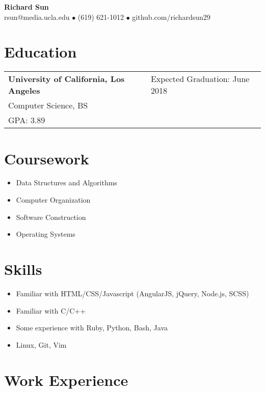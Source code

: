 \documentclass{article}
\begin{document}

  \begin{center}
    \Huge \textbf{Richard Sun}\\[1ex]
    \large
    rsun@media.ucla.edu $\bullet$
    (619) 621-1012 $\bullet$
    github.com/richardsun29
  \end{center}


  \section*{Education}

    \begin{tabularx}{\textwidth}{Xl}
      \textbf{University of California, Los Angeles} & Expected Graduation: June 2018\\
      Computer Science, BS &\\
      GPA: 3.89
    \end{tabularx}


  \section*{Coursework}

    \begin{itemize}
      \item Data Structures and Algorithms
      \item Computer Organization
      \item Software Construction
      \item Operating Systems
    \end{itemize}


  \section*{Skills}

    \begin{itemize}
      \item Familiar with HTML/CSS/Javascript (AngularJS, jQuery, Node.js, SCSS)
      \item Familiar with C/C++
      \item Some experience with Ruby, Python, Bash, Java
      \item Linux, Git, Vim
    \end{itemize}


  \section*{Work Experience}
\end{document}

